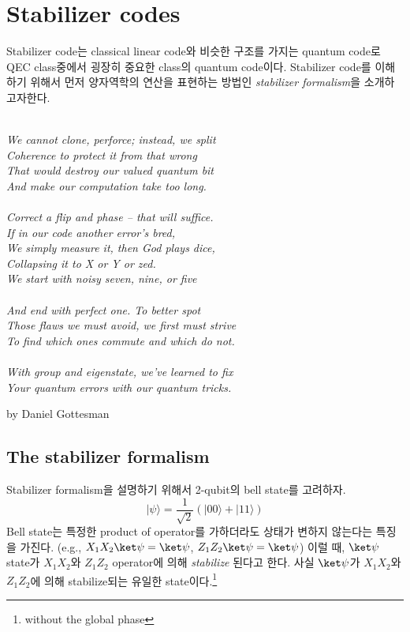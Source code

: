 \section{Stabilizer codes}
Stabilizer code는 classical linear code와 비슷한 구조를 가지는 quantum code로 QEC class중에서 굉장히 중요한 class의 quantum code이다. Stabilizer code를 이해하기 위해서 먼저 양자역학의 연산을 표현하는 방법인 \textit{stabilizer formalism}을 소개하고자한다. 
\begin{note}
    \textit{\\We cannot clone, perforce; instead, we split\\ 
    Coherence to protect it from that wrong\\
    That would destroy our valued quantum bit\\
    And make our computation take too long.\\ \\
    Correct a flip and phase – that will suffice.\\
    If in our code another error’s bred,\\
    We simply measure it, then God plays dice,\\
    Collapsing it to X or Y or zed.\\
    We start with noisy seven, nine, or five\\ \\
    And end with perfect one. To better spot\\
    Those flaws we must avoid, we first must strive\\
    To find which ones commute and which do not.\\ \\
    With group and eigenstate, we’ve learned to fix\\
    Your quantum errors with our quantum tricks.}
    
    by Daniel Gottesman
\end{note}
\subsection{The stabilizer formalism}
Stabilizer formalism을 설명하기 위해서 2-qubit의 bell state를 고려하자.
\begin{equation*}
    |\psi\rangle=\frac{1}{\sqrt{2}}(|00\rangle+|11\rangle)
\end{equation*}
Bell state는 특정한 product of operator를 가하더라도 상태가 변하지 않는다는 특징을 가진다. (e.g., $X_1X_2 \ket \psi = \ket \psi$, $Z_1Z_2 \ket \psi = \ket \psi$) 이럴 때, $\ket \psi$ state가 $X_1X_2$와 $Z_1Z_2$ operator에 의해 \textit{stabilize} 된다고 한다. 사실 $\ket \psi$가 $X_1X_2$와 $Z_1Z_2$에 의해 stabilize되는 유일한 state이다.\footnote{without the global phase}

